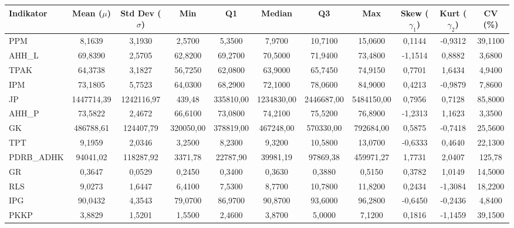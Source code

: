 \begin{adjustbox}{max width=\textwidth}
\small
\begin{tabular}{|>{\centering\arraybackslash}p{2.5cm}|c|c|c|c|c|c|c|c|c|c|}
\hline
\textbf{Indikator} & \textbf{Mean ($\mu$)} & \textbf{Std Dev ($\sigma$)} & \textbf{Min} & \textbf{Q1} & \textbf{Median} & \textbf{Q3} & \textbf{Max} & \textbf{Skew ($\gamma_1$)} & \textbf{Kurt ($\gamma_2$)} & \textbf{CV (\%)} \\
\hline
PPM & 8,1639 & 3,1930 & 2,5700 & 5,3500 & 7,9700 & 10,7100 & 15,0600 & 0,1144 & -0,9312 & 39,1100 \\
AHH\_L & 69,8390 & 2,5705 & 62,8200 & 69,2700 & 70,5000 & 71,9400 & 73,4800 & -1,1514 & 0,8882 & 3,6800 \\
TPAK & 64,3738 & 3,1827 & 56,7250 & 62,0800 & 63,9000 & 65,7450 & 74,9150 & 0,7701 & 1,6434 & 4,9400 \\
IPM & 73,1805 & 5,7523 & 64,0300 & 68,2900 & 72,1000 & 78,0600 & 84,9000 & 0,4213 & -0,9879 & 7,8600 \\
JP & 1447714,39 & 1242116,97 & 439,48 & 335810,00 & 1234830,00 & 2446687,00 & 5484150,00 & 0,7956 & 0,7128 & 85,8000 \\
AHH\_P & 73,5822 & 2,4672 & 66,6100 & 73,0800 & 74,2100 & 75,5200 & 76,8900 & -1,2313 & 1,1623 & 3,3500 \\
GK & 486788,61 & 124407,79 & 320050,00 & 378819,00 & 467248,00 & 570330,00 & 792684,00 & 0,5875 & -0,7418 & 25,5600 \\
TPT & 9,1959 & 2,0346 & 3,2500 & 8,2300 & 9,3200 & 10,5800 & 13,0700 & -0,6333 & 0,4640 & 22,1300 \\
PDRB\_ADHK & 94041,02 & 118287,92 & 3371,78 & 22787,90 & 39981,19 & 97869,38 & 459971,27 & 1,7731 & 2,0407 & 125,78 \\
GR & 0,3647 & 0,0529 & 0,2450 & 0,3400 & 0,3630 & 0,3880 & 0,5150 & 0,3782 & 1,0149 & 14,5000 \\
RLS & 9,0273 & 1,6447 & 6,4100 & 7,5300 & 8,7700 & 10,7800 & 11,8200 & 0,2434 & -1,3084 & 18,2200 \\
IPG & 90,0432 & 4,3543 & 79,0700 & 86,9700 & 90,8700 & 93,6000 & 96,2800 & -0,6450 & -0,2436 & 4,8400 \\
PKKP & 3,8829 & 1,5201 & 1,5500 & 2,4600 & 3,8700 & 5,0000 & 7,1200 & 0,1816 & -1,1459 & 39,1500 \\
\hline
\end{tabular}
\end{adjustbox}
